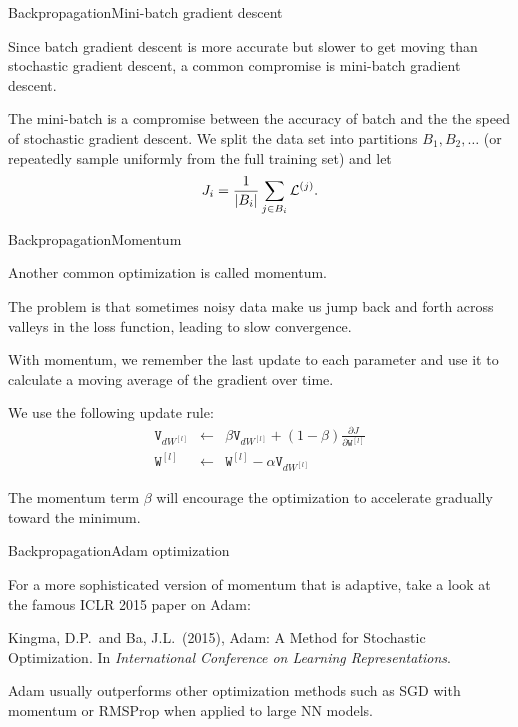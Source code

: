 \documentclass{beamer}
\newcommand{\mat}[1]{\mathtt{#1}}
\begin{document}
\begin{frame}{Backpropagation}{Mini-batch gradient descent}

  Since batch gradient descent is more accurate but slower to get
  moving than stochastic gradient descent, a common compromise is
  \alert{mini-batch gradient descent}.

  \medskip

  The mini-batch is a compromise between the accuracy of batch and the
  the speed of stochastic gradient descent. We split the data set into
  partitions $B_1, B_2, \ldots$ (or repeatedly sample uniformly from
  the full training set) and let
  \[ J_{i} = \frac{1}{|B_i|}\sum_{j \in B_i}{\cal L}^{(j)}. \]

\end{frame}


\begin{frame}{Backpropagation}{Momentum}

  Another common optimization is called \alert{momentum}.

  \medskip

  The problem is that sometimes noisy data make us jump back and forth across valleys in the loss function, leading to slow convergence.

  \medskip

  With momentum, we remember the last update to each parameter and use
  it to calculate a moving average of the gradient over time.

  \medskip

  We use the following update rule:
  \begin{eqnarray*}
    \mat{V}_{dW^{[l]}} & \leftarrow & \beta \mat{V}_{dW^{[l]}}+ (1-\beta)
    \frac{\partial J}{\partial \mat{W}^{[l]}} \\
    \mat{W}^{[l]} & \leftarrow & \mat{W}^{[l]} - \alpha \mat{V}_{dW^{[l]}}
  \end{eqnarray*}

  The momentum term $\beta$ will encourage the optimization to
  accelerate gradually toward the minimum.
    
\end{frame}


\begin{frame}{Backpropagation}{Adam optimization}

  For a more sophisticated version of momentum that is adaptive,
  take a look at the famous ICLR 2015 paper on \alert{Adam}:
  
  \medskip

  Kingma, D.P.\ and Ba, J.L.\ (2015), Adam: A Method for
  Stochastic Optimization. In \textit{International Conference on Learning
    Representations}.

  \medskip

  Adam usually outperforms other optimization methods such as SGD with
  momentum or RMSProp when applied to large NN models.

\end{frame}
\end{document}
